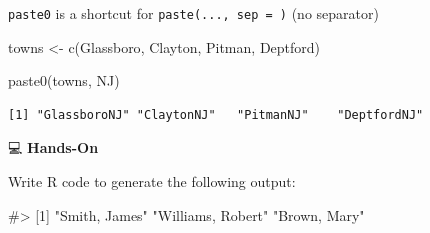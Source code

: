 \documentclass[
  letterpaper,
  DIV=11,
  numbers=noendperiod]{scrreprt}
\newenvironment{Shaded}{\begin{snugshade}}{\end{snugshade}}
\newcommand{\CommentTok}[1]{\textcolor[rgb]{0.37,0.37,0.37}{#1}}
\newcommand{\FunctionTok}[1]{\textcolor[rgb]{0.28,0.35,0.67}{#1}}
\newcommand{\NormalTok}[1]{\textcolor[rgb]{0.00,0.23,0.31}{#1}}
\newcommand{\OtherTok}[1]{\textcolor[rgb]{0.00,0.23,0.31}{#1}}
\newcommand{\StringTok}[1]{\textcolor[rgb]{0.13,0.47,0.30}{#1}}
\begin{document}
\begin{tcolorbox}[enhanced jigsaw, colbacktitle=quarto-callout-tip-color!10!white, opacitybacktitle=0.6, breakable, left=2mm, leftrule=.75mm, toprule=.15mm, toptitle=1mm, bottomtitle=1mm, colframe=quarto-callout-tip-color-frame, opacityback=0, coltitle=black, arc=.35mm, titlerule=0mm, colback=white, bottomrule=.15mm, title=\textcolor{quarto-callout-tip-color}{\faLightbulb}\hspace{0.5em}{Answer}, rightrule=.15mm]

\texttt{paste0} is a shortcut for
\texttt{paste(...,\ sep\ =\ \textquotesingle{}\textquotesingle{})} (no
separator)

\begin{Shaded}
\begin{Highlighting}[]
\NormalTok{towns }\OtherTok{\textless{}{-}} \FunctionTok{c}\NormalTok{(}\StringTok{\textquotesingle{}Glassboro\textquotesingle{}}\NormalTok{, }\StringTok{\textquotesingle{}Clayton\textquotesingle{}}\NormalTok{, }\StringTok{\textquotesingle{}Pitman\textquotesingle{}}\NormalTok{, }\StringTok{\textquotesingle{}Deptford\textquotesingle{}}\NormalTok{)}

\FunctionTok{paste0}\NormalTok{(towns, }\StringTok{\textquotesingle{}NJ\textquotesingle{}}\NormalTok{)}
\end{Highlighting}
\end{Shaded}

\begin{verbatim}
[1] "GlassboroNJ" "ClaytonNJ"   "PitmanNJ"    "DeptfordNJ" 
\end{verbatim}

\end{tcolorbox}

💻 \textbf{Hands-On}

Write R code to generate the following output:

\begin{Shaded}
\begin{Highlighting}[]
\CommentTok{\#\textgreater{} [1] "Smith, James"     "Williams, Robert" "Brown, Mary"}
\end{Highlighting}
\end{Shaded}
\end{document}
